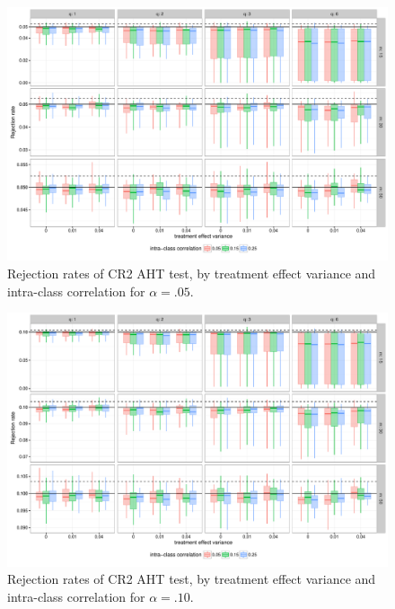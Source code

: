 \documentclass{article}\usepackage[]{graphicx}\usepackage[]{color}
\newenvironment{knitrout}{}{} %
\begin{document}
\begin{landscape}
\begin{knitrout}
\begin{figure}[H]
{\centering \includegraphics[width=\linewidth]{CR_fig/misspecification_05-1} 

}

\caption[Rejection rates of CR2 AHT test, by treatment effect variance and intra-class correlation for ]{Rejection rates of CR2 AHT test, by treatment effect variance and intra-class correlation for $\alpha = .05$.}\label{fig:misspecification_05}
\end{figure}


\end{knitrout}

\begin{knitrout}
\color{fgcolor}\begin{figure}[H]

{\centering \includegraphics[width=\linewidth]{CR_fig/misspecification_10-1} 

}

\caption[Rejection rates of CR2 AHT test, by treatment effect variance and intra-class correlation for ]{Rejection rates of CR2 AHT test, by treatment effect variance and intra-class correlation for $\alpha = .10$.}\label{fig:misspecification_10}
\end{figure}


\end{knitrout}
\end{landscape}



\end{document}
